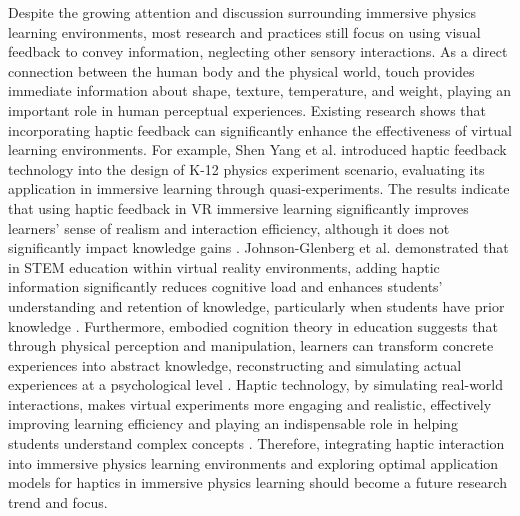 \documentclass[runningheads]{llncs}
\begin{document}
Despite the growing attention and discussion surrounding immersive physics learning environments, most research and practices still focus on using visual feedback to convey information, neglecting other sensory interactions. As a direct connection between the human body and the physical world, touch provides immediate information about shape, texture, temperature, and weight, playing an important role in human perceptual experiences\cite{zhang2023active}. Existing research shows that incorporating haptic feedback can significantly enhance the effectiveness of virtual learning environments. For example, Shen Yang et al. introduced haptic feedback technology into the design of K-12 physics experiment scenario, evaluating its application in immersive learning through quasi-experiments. The results indicate that using haptic feedback in VR immersive learning significantly improves learners' sense of realism and interaction efficiency, although it does not significantly impact knowledge gains \cite{shen2023research}. Johnson-Glenberg et al. demonstrated that in STEM education within virtual reality environments, adding haptic information significantly reduces cognitive load and enhances students' understanding and retention of knowledge, particularly when students have prior knowledge \cite{johnson2023embodied}. Furthermore, embodied cognition theory in education suggests that through physical perception and manipulation, learners can transform concrete experiences into abstract knowledge, reconstructing and simulating actual experiences at a psychological level \cite{varela2017embodied}. Haptic technology, by simulating real-world interactions, makes virtual experiments more engaging and realistic, effectively improving learning efficiency and playing an indispensable role in helping students understand complex concepts \cite{shapiro2019embodied}. Therefore, integrating haptic interaction into immersive physics learning environments and exploring optimal application models for haptics in immersive physics learning should become a future research trend and focus.
\end{document}
